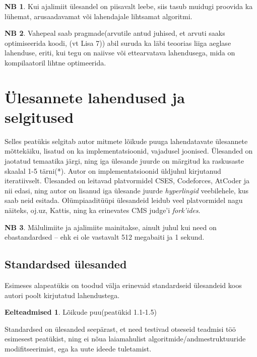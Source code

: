 \documentclass{trkut}
\theoremstyle{definition}
\newtheorem*{prereq}{Eelteadmised}
\newtheorem*{extra}{NB}
\begin{document}
\begin{extra}
Kui ajalimiit ülesandel on piisavalt leebe, siis tasub muidugi proovida ka lühemat, arusaadavamat või lahendajale lihtsamat algoritmi.
\end{extra}
\begin{extra}
Vahepeal saab pragmade(arvutile antud juhised, et arvuti saaks optimiseerida koodi, (vt Lisa 7)) abil suruda ka läbi teoorias liiga aeglase lahenduse, eriti, kui tegu on naiivse või ettearvatava lahendusega, mida on kompilaatoril lihtne optimeerida.
\end{extra}

\section{Ülesannete lahendused ja selgitused} 
Selles peatükis selgitab autor mitmete lõikude puuga lahendatavate ülesannete mõttekäiku, lisatud on ka implementatsioonid, vajadusel joonised.
Ülesanded on jaotatud temaatika järgi, ning iga ülesande juurde on märgitud ka raskusaste skaalal 1-5 tärni(*).
Autor on implementatsioonid üldjuhul kirjutanud iteratiivselt.
Ülesanded on leitavad platvormidel CSES, Codeforces, AtCoder ja nii edasi, ning autor on lisanud iga ülesande juurde\textit{ hyperlingid} veebilehele, kus saab neid esitada.
Olümpiaaditüüpi ülesandeid leidub veel platvormidel nagu näiteks, oj.uz, Kattis, ning ka erinevates CMS judge'i \textit{fork'ides}.
\begin{extra}
Mälulimiite ja ajalimiite mainitakse, ainult juhul kui need on ebastandardsed -- ehk ei ole vastavalt 512 megabaiti ja 1 sekund.
\end{extra}
\subsection{Standardsed ülesanded}
Esimeses alapeatükis on toodud välja erinevaid standardseid ülesandeid koos autori poolt kirjutatud lahendustega.
\begin{prereq}
Lõikude puu(peatükid 1.1-1.5)
\end{prereq}
Standardsed on ülesanded seepärast, et need testivad otseseid teadmisi töö esimesest peatükist, ning ei nõua laiamahulist algoritmide/andmestruktuuride modifitseerimist, ega ka uute ideede tuletamist.
\end{document}
